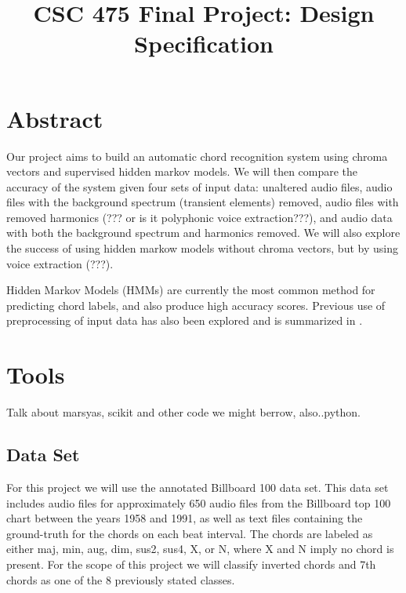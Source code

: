 \documentclass{article}
\title{CSC 475 Final Project: Design Specification}
\begin{document}
%
\maketitle
%

\section{Abstract}\label{sec:desoutline}
Our project aims to build an automatic chord recognition system using chroma vectors and supervised hidden markov 
models. We will then compare the accuracy of the system given four sets of input data: unaltered audio files, audio 
files with the background spectrum (transient elements) removed, audio files with removed harmonics (??? or is it 
polyphonic voice extraction???), and audio data with both the background spectrum and harmonics removed. We will 
also explore the success of using hidden markow models without chroma vectors, but by using voice extraction (???).

Hidden Markov Models (HMMs) are currently the most common method for predicting chord labels, and also 
produce high accuracy scores. Previous use of preprocessing of input data has also been explored and is
summarized in \cite{McVicar:00}.

\section{Tools}\label{sec:tools}

Talk about marsyas, scikit and other code we might berrow, also..python.

\subsection{Data Set}

For this project we will use the annotated Billboard 100 data set. This data set includes audio files for 
approximately 650 audio files from the Billboard top 100 chart between the years 1958 and 1991, as well as text
files containing the ground-truth for the chords on each beat interval\cite{Burgoyne:07}. The chords are labeled
as either maj, min, aug, dim, sus2, sus4, X, or N, where X and N imply no chord is present. For the scope of this
project we will classify inverted chords and 7th chords as one of the 8 previously stated classes.

\end{document}
